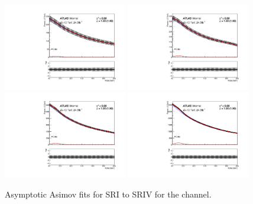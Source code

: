 \begin{figure}[htbp]
  \centering
 \includegraphics[width=0.48\textwidth]{figures/VBF/Asimov_testVBF_ICHEP_4cen_SRI.pdf}
 \includegraphics[width=0.48\textwidth]{figures/VBF/Asimov_testVBF_ICHEP_4cen_SRII.pdf}
 \includegraphics[width=0.48\textwidth]{figures/VBF/Asimov_testVBF_ICHEP_4cen_SRIII.pdf}
 \includegraphics[width=0.48\textwidth]{figures/VBF/Asimov_testVBF_ICHEP_4cen_SRIV.pdf}\\

\caption{Asymptotic Asimov fits for SRI to SRIV for the \fourcentral channel.}
  \label{fig:4cenAsimov}
\end{figure}



